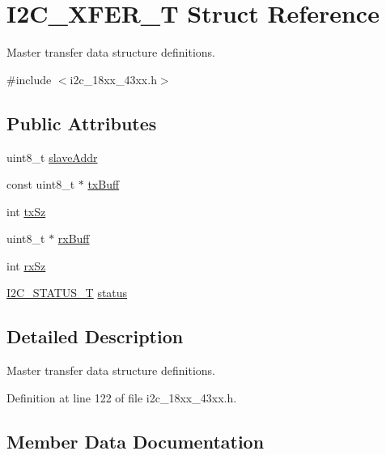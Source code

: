 \hypertarget{struct_i2_c___x_f_e_r___t}{}\section{I2\+C\+\_\+\+X\+F\+E\+R\+\_\+T Struct Reference}
\label{struct_i2_c___x_f_e_r___t}


Master transfer data structure definitions.  




{\ttfamily \#include $<$i2c\+\_\+18xx\+\_\+43xx.\+h$>$}

\subsection*{Public Attributes}
\begin{DoxyCompactItemize}
\item 
uint8\+\_\+t \hyperlink{struct_i2_c___x_f_e_r___t_a39393422071ba7bca5d22e15b110e723}{slave\+Addr}
\item 
const uint8\+\_\+t $\ast$ \hyperlink{struct_i2_c___x_f_e_r___t_a673ce41b59a715c6e91e3d041885554b}{tx\+Buff}
\item 
int \hyperlink{struct_i2_c___x_f_e_r___t_a6ff8668411b06d3dc4ab9d942ffca896}{tx\+Sz}
\item 
uint8\+\_\+t $\ast$ \hyperlink{struct_i2_c___x_f_e_r___t_a905dce25e8fc1dc85c4b76e789f62623}{rx\+Buff}
\item 
int \hyperlink{struct_i2_c___x_f_e_r___t_a8c5b062847cfd0fe9b27058743de8aa5}{rx\+Sz}
\item 
\hyperlink{group___i2_c__18_x_x__43_x_x_ga21aa839302786105dcf6a96be0e6e8bc}{I2\+C\+\_\+\+S\+T\+A\+T\+U\+S\+\_\+T} \hyperlink{struct_i2_c___x_f_e_r___t_aefc3cfe9bf7cdaeb2a632c42250602ad}{status}
\end{DoxyCompactItemize}


\subsection{Detailed Description}
Master transfer data structure definitions. 

Definition at line 122 of file i2c\+\_\+18xx\+\_\+43xx.\+h.



\subsection{Member Data Documentation}
\mbox{\label{struct_i2_c___x_f_e_r___t_a905dce25e8fc1dc85c4b76e789f62623}} 
